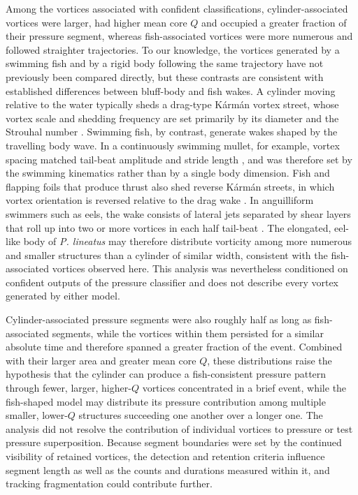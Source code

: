 \documentclass[openacc]{rsproca_new}
\begin{document}
Among the vortices associated with confident classifications, cylinder-associated vortices were larger, had higher mean core $Q$ and occupied a greater fraction of their pressure segment, whereas fish-associated vortices were more numerous and followed straighter trajectories. To our knowledge, the vortices generated by a swimming fish and by a rigid body following the same trajectory have not previously been compared directly, but these contrasts are consistent with established differences between bluff-body and fish wakes. A cylinder moving relative to the water typically sheds a drag-type K\'arm\'an vortex street, whose vortex scale and shedding frequency are set primarily by its diameter and the Strouhal number \cite{williamson1996,williamson1998}. Swimming fish, by contrast, generate wakes shaped by the travelling body wave. In a continuously swimming mullet, for example, vortex spacing matched tail-beat amplitude and stride length \cite{muller1997}, and was therefore set by the swimming kinematics rather than by a single body dimension. Fish and flapping foils that produce thrust also shed reverse K\'arm\'an streets, in which vortex orientation is reversed relative to the drag wake \cite{triantafyllou1991,thandiackal2023}. In anguilliform swimmers such as eels, the wake consists of lateral jets separated by shear layers that roll up into two or more vortices in each half tail-beat \cite{tytell2004,tytell2004b}. The elongated, eel-like body of \textit{P. lineatus} may therefore distribute vorticity among more numerous and smaller structures than a cylinder of similar width, consistent with the fish-associated vortices observed here. This analysis was nevertheless conditioned on confident outputs of the pressure classifier and does not describe every vortex generated by either model.

Cylinder-associated pressure segments were also roughly half as long as fish-associated segments, while the vortices within them persisted for a similar absolute time and therefore spanned a greater fraction of the event. Combined with their larger area and greater mean core $Q$, these distributions raise the hypothesis that the cylinder can produce a fish-consistent pressure pattern through fewer, larger, higher-$Q$ vortices concentrated in a brief event, while the fish-shaped model may distribute its pressure contribution among multiple smaller, lower-$Q$ structures succeeding one another over a longer one. The analysis did not resolve the contribution of individual vortices to pressure or test pressure superposition. Because segment boundaries were set by the continued visibility of retained vortices, the detection and retention criteria influence segment length as well as the counts and durations measured within it, and tracking fragmentation could contribute further.
\end{document}
